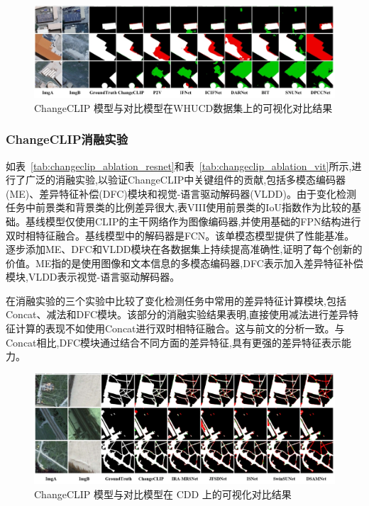 \begin{figure}[!htbp]
  \centering
  \includegraphics[width=\textwidth]{paper_figures/基于AI基础模型微调的变化检测模型研究/ChangeCLIP/changeclip_whucd.png}
  \caption{ChangeCLIP 模型与对比模型在WHUCD数据集上的可视化对比结果}
  \label{fig:changeclip_whucd}
\end{figure}


\subsubsection{ChangeCLIP消融实验}

如表~\ref{tab:changeclip_ablation_resnet}和表~\ref{tab:changeclip_ablation_vit}所示,进行了广泛的消融实验,以验证ChangeCLIP中关键组件的贡献,包括多模态编码器(ME)、差异特征补偿(DFC)模块和视觉-语言驱动解码器(VLDD)。由于变化检测任务中前景类和背景类的比例差异很大,表VIII使用前景类的IoU指数作为比较的基础。基线模型仅使用CLIP的主干网络作为图像编码器,并使用基础的FPN结构进行双时相特征融合。基线模型中的解码器是FCN。该单模态模型提供了性能基准。逐步添加ME、DFC和VLDD模块在各数据集上持续提高准确性,证明了每个创新的价值。ME指的是使用图像和文本信息的多模态编码器,DFC表示加入差异特征补偿模块,VLDD表示视觉-语言驱动解码器。

在消融实验的三个实验中比较了变化检测任务中常用的差异特征计算模块,包括Concat、减法和DFC模块。该部分的消融实验结果表明,直接使用减法进行差异特征计算的表现不如使用Concat进行双时相特征融合。这与前文的分析一致。与Concat相比,DFC模块通过结合不同方面的差异特征,具有更强的差异特征表示能力。

\begin{figure}[!htbp]
  \centering
  \includegraphics[width=\textwidth]{paper_figures/基于AI基础模型微调的变化检测模型研究/ChangeCLIP/changeclip_cdd.png}
  \caption{ChangeCLIP 模型与对比模型在 CDD 上的可视化对比结果}
  \label{fig:changeclip_cdd}
\end{figure}

